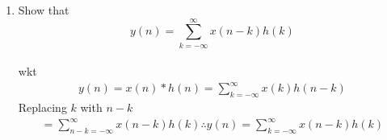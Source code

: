 \documentclass[journal,12pt,twocolumn]{IEEEtran}
\renewcommand\thesection{\arabic{section}}
\begin{document}
\begin{enumerate}[label=\thesection.\arabic*]
$\therefore Y^{T}= X*H$\\
 The following code plots Fig. \ref{fig:ynconv}. Note that this is the same as 
$y(n)$ in  Fig. 
\ref{fig:xnyn}. 
%
\begin{lstlisting}
wget https://github.com/Pranavb060504/SIgnalProcessing/blob/main/6/ynconv.py
\end{lstlisting}
Use the following command in the terminal to run the code
\begin{lstlisting}
python3 ynconv.py
\end{lstlisting}
\begin{figure}[!ht]
\centering
\texttt{[image: /home/pranav/Desktop/Signal processing/5/ynconv]}
\caption{$y(n)$ from the definition of convolution}
\label{fig:ynconv}
\end{figure}

\item Show that
\begin{equation}
y(n) =  \sum_{k=-\infty}^{\infty}x(n-k)h(k)
\end{equation}\\
\solution
wkt
\begin{align}
y(n) = x(n)*h(n) = \sum_{k=-\infty}^{\infty}x(k)h(n-k)
\end{align} 
Replacing $k$ with $n-k$
\begin{align}
=\sum_{n-k=-\infty}^{\infty}x(n-k)h(k)
\therefore y(n)=\sum_{k=-\infty}^{\infty}x(n-k)h(k)
\end{align}
\end{enumerate}
%
\end{document}
